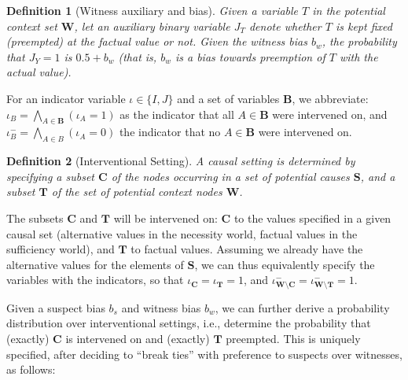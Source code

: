 \documentclass[twoside,11pt]{article}
\newtheorem{definition}{Definition}
\begin{document}
\begin{definition}[Witness auxiliary and bias]
    Given a variable \(T\) in the potential context set \(\mathbf{W}\), let an auxiliary binary variable \(J_T\) denote whether \(T\) is kept fixed (preempted) at the factual value or not. Given the witness  bias \(b_w\), the probability that \(J_Y=1\)  is \(0.5 + b_w\) (that is, $b_w$ is a bias towards preemption of $T$ with the actual value).
\end{definition}

\noindent For an indicator variable $\iota\in \{I, J\}$ and a set of variables \(\mathbf{B}\), we abbreviate: \(\iota_B = \bigwedge_{A \in \mathbf{B}} \left(\iota _A = 1 \right)\) as the indicator that all $A \in \mathbf{B}$ were intervened on,   and \(\iota_B^- = \bigwedge_{A\in B} \left(\iota_A = 0\right)\) the indicator that no $A \in \mathbf{B}$ were intervened on.

\begin{definition}[Interventional Setting] \label{def:interventional_setting} A causal setting is determined by specifying a subset $\mathbf{C}$ of the nodes occurring in a set of potential causes $\mathbf{S}$, and
    a subset $\mathbf{T}$ of the set of potential context nodes $\mathbf{W}$.
\end{definition}


The subsets $\mathbf{C}$ and $\mathbf{T}$ will be intervened on: $\mathbf{C}$ to the values specified in a given causal set (alternative values in the necessity world, factual values in the sufficiency world), and $\mathbf{T}$ to factual values. Assuming we already have the alternative values for the elements of $\mathbf{S}$, we can thus equivalently specify the variables with the indicators, so that $\iota_{\mathbf{C}} = \iota_{\mathbf{T}} = 1$, and $\iota^{-}_{\mathbf{W} \setminus \mathbf{C}} = \iota^{-}_{\mathbf{W} \setminus \mathbf{T}} = 1$.

Given a suspect bias $b_s$ and witness bias $b_w$, we can further derive a probability distribution over interventional settings, i.e., determine the probability that (exactly) $\mathbf{C}$ is intervened on and (exactly) $\mathbf{T}$ preempted. This is uniquely specified, after deciding to ``break ties'' with preference to suspects over witnesses, as follows:
\end{document}
